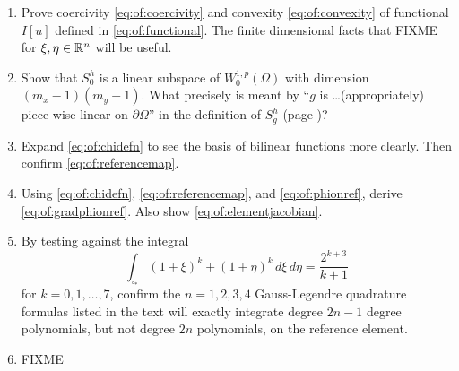 \renewcommand{\labelenumi}{\arabic{chapter}.\arabic{enumi}\quad}
\renewcommand{\labelenumii}{(\alph{enumii})}
\begin{enumerate}
\item Prove coercivity \eqref{eq:of:coercivity} and convexity \eqref{eq:of:convexity} of functional $I[u]$ defined in \eqref{eq:of:functional}.  The finite dimensional facts that FIXME for $\xi,\eta\in\mathbb{R}^n$ will be useful.

\item Show that $S_0^h$ is a linear subspace of $W_0^{1,p}(\Omega)$ with dimension $(m_x-1)(m_y-1)$.  What precisely is meant by ``$g$ is \dots (appropriately) piece-wise linear on $\partial\Omega$'' in the definition of $S_g^h$ (page \pageref{eq:of:Shdefn})?

\item Expand \eqref{eq:of:chidefn} to see the basis of bilinear functions more clearly.  Then confirm \eqref{eq:of:referencemap}.

\item Using \eqref{eq:of:chidefn}, \eqref{eq:of:referencemap}, and \eqref{eq:of:phionref}, derive \eqref{eq:of:gradphionref}.  Also show \eqref{eq:of:elementjacobian}.

\item By testing against the integral
    $$\int_{\square_\ast} (1+\xi)^k + (1+\eta)^k\,d\xi\, d\eta = \frac{2^{k+3}}{k+1}$$
for $k=0,1,\dots,7$, confirm the $n=1,2,3,4$ Gauss-Legendre quadrature formulas listed in the text will exactly integrate degree $2n-1$ degree polynomials, but not degree $2n$ polynomials, on the reference element.

\item FIXME
\end{enumerate}